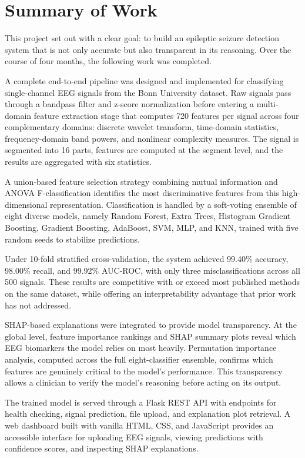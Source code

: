 
\section{Summary of Work}

This project set out with a clear goal: to build an epileptic seizure detection system that is not only accurate but also transparent in its reasoning. Over the course of four months, the following work was completed.

A complete end-to-end pipeline was designed and implemented for classifying single-channel EEG signals from the Bonn University dataset. Raw signals pass through a bandpass filter and z-score normalization before entering a multi-domain feature extraction stage that computes 720 features per signal across four complementary domains: discrete wavelet transform, time-domain statistics, frequency-domain band powers, and nonlinear complexity measures. The signal is segmented into 16 parts, features are computed at the segment level, and the results are aggregated with six statistics.

A union-based feature selection strategy combining mutual information and ANOVA F-classification identifies the most discriminative features from this high-dimensional representation. Classification is handled by a soft-voting ensemble of eight diverse models, namely Random Forest, Extra Trees, Histogram Gradient Boosting, Gradient Boosting, AdaBoost, SVM, MLP, and KNN, trained with five random seeds to stabilize predictions.

Under 10-fold stratified cross-validation, the system achieved 99.40\% accuracy, 98.00\% recall, and 99.92\% AUC-ROC, with only three misclassifications across all 500 signals. These results are competitive with or exceed most published methods on the same dataset, while offering an interpretability advantage that prior work has not addressed.

SHAP-based explanations were integrated to provide model transparency. At the global level, feature importance rankings and SHAP summary plots reveal which EEG biomarkers the model relies on most heavily. Permutation importance analysis, computed across the full eight-classifier ensemble, confirms which features are genuinely critical to the model's performance. This transparency allows a clinician to verify the model's reasoning before acting on its output.

The trained model is served through a Flask REST API with endpoints for health checking, signal prediction, file upload, and explanation plot retrieval. A web dashboard built with vanilla HTML, CSS, and JavaScript provides an accessible interface for uploading EEG signals, viewing predictions with confidence scores, and inspecting SHAP explanations.

